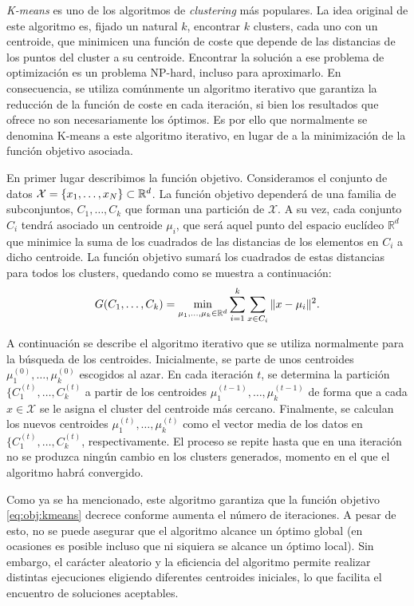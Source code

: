 \emph{K-means} es uno de los algoritmos de \emph{clustering} más populares. La idea original de este algoritmo es, fijado un natural $k$, encontrar $k$ clusters, cada uno con un centroide, que minimicen una función de coste que depende de las distancias de los puntos del cluster a su centroide. Encontrar la solución a ese problema de optimización es un problema NP-hard, incluso para aproximarlo. En consecuencia, se utiliza comúnmente un algoritmo iterativo que garantiza la reducción de la función de coste en cada iteración, si bien los resultados que ofrece no son necesariamente los óptimos. Es por ello que normalmente se denomina K-means a este algoritmo iterativo, en lugar de a la minimización de la función objetivo asociada.

En primer lugar describimos la función objetivo. Consideramos el conjunto de datos $\mathcal{X} = \{x_1,\dots,x_N\} \subset \mathbb{R}^d$. La función objetivo dependerá de una familia de subconjuntos, $C_1,\dots,C_k$ que forman una partición de $\mathcal{X}$. A su vez, cada conjunto $C_i$ tendrá asociado un centroide $\mu_i$, que será aquel punto del espacio euclídeo $\mathbb{R}^d$ que minimice la suma de los cuadrados de las distancias de los elementos en $C_i$ a dicho centroide.  La función objetivo sumará los cuadrados de estas distancias para todos los clusters, quedando como se muestra a continuación:
\begin{equation} \label{eq:obj:kmeans}
    G(C_1,\dots,C_k) = \min_{\mu_1,\dots,\mu_k \in \mathbb{R}^d} \sum_{i=1}^{k}\sum_{x\in C_i} \|x-\mu_i\|^2.
\end{equation}

A continuación se describe el algoritmo iterativo que se utiliza normalmente para la búsqueda de los centroides. Inicialmente, se parte de unos centroides $\mu_1^{(0)},\dots,\mu_k^{(0)}$ escogidos al azar. En cada iteración $t$, se determina la partición $\{C_1^{(t)},\dots,C_k^{(t)}$ a partir de los centroides $\mu_1^{(t-1)},\dots,\mu_k^{(t-1)}$ de forma que a cada $x \in \mathcal{X}$ se le asigna el cluster del centroide más cercano. Finalmente, se calculan los nuevos centroides $\mu_1^{(t)},\dots,\mu_k^{(t)}$ como el vector media de los datos en $\{C_1^{(t)},\dots,C_k^{(t)}$, respectivamente. El proceso se repite hasta que en una iteración no se produzca ningún cambio en los clusters generados, momento en el que el algoritmo habrá convergido.

Como ya se ha mencionado, este algoritmo garantiza que la función objetivo \ref{eq:obj:kmeans} decrece conforme aumenta el número de iteraciones. A pesar de esto, no se puede asegurar que el algoritmo alcance un óptimo global (en ocasiones es posible incluso que ni siquiera se alcance un óptimo local). Sin embargo, el carácter aleatorio y la eficiencia del algoritmo permite realizar distintas ejecuciones eligiendo diferentes centroides iniciales, lo que facilita el encuentro de soluciones aceptables. 

